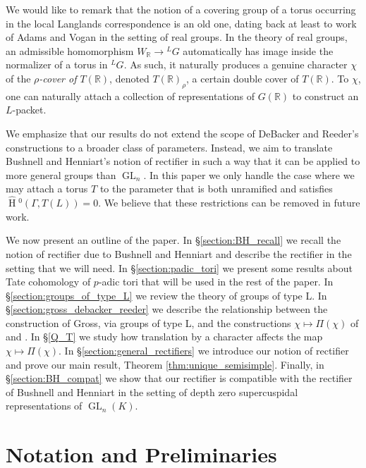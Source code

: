 \documentclass{mrlart7}
\theoremstyle{plain}
\newcommand{\HT}[1]{\hat{\HH}{}^{#1}}
\theoremstyle{definition}
\numberwithin{equation}{section}
\DeclareMathOperator{\HH}{H}
\DeclareMathOperator{\GL}{GL}
\begin{document}
We would like to remark that the notion of a covering group of a torus occurring in the local Langlands
correspondence is an old one, dating back at least to work of Adams and Vogan \cite{adams-vogan:91}
in the setting of real groups.  In the theory of real groups, an admissible homomorphism
$W_{\mathbb{R}} \rightarrow {}^L G$ automatically has image inside the normalizer of a torus in ${}^L G$.
As such, it naturally produces a genuine character $\chi$ of the \emph{$\rho$-cover of $T(\mathbb{R})$},
denoted $T(\mathbb{R})_{\rho}$, a certain double cover of $T(\mathbb{R})$.  To $\chi$,
one can naturally attach a collection of representations of $G(\mathbb{R})$ to construct an $L$-packet.

We emphasize that our results do not extend the scope of DeBacker and Reeder's constructions to a broader class of parameters.
Instead, we aim to translate Bushnell and Henniart's notion of rectifier in such a way that it can be applied
to more general groups than $\GL_n$.  In this paper we only handle the case where we may attach a torus $T$
to the parameter that is both unramified and satisfies $\HT{0}(\Gamma, T(L)) = 0$.  We believe that these restrictions can be removed in future work.

We now present an outline of the paper.  In \S\ref{section:BH_recall} we recall
the notion of rectifier due to Bushnell and Henniart and describe
the rectifier in the setting that we will need.  In \S\ref{section:padic_tori}
we present some results about Tate cohomology of $p$-adic tori that will be used
in the rest of the paper.  In \S\ref{section:groups_of_type_L} we review
the theory of groups of type L.  In
\S\ref{section:gross_debacker_reeder} we describe the relationship between the
construction of Gross, via groups of type L, and the constructions $\chi \mapsto \Pi(\chi)$ of
\cite{reeder-debacker:09a} and \cite{reeder:08a}.  In \S\ref{Q_T} we study how translation by a character affects
the map $\chi \mapsto \Pi(\chi)$.
In \S\ref{section:general_rectifiers} we
introduce our notion of rectifier and prove our main result, Theorem \ref{thm:unique_semisimple}.
Finally, in \S\ref{section:BH_compat} we show that our rectifier is compatible with
the rectifier of Bushnell and Henniart in the setting of depth zero
supercuspidal representations of $\GL_n(K)$.

\section{Notation and Preliminaries} \label{section:notation}
\end{document}
